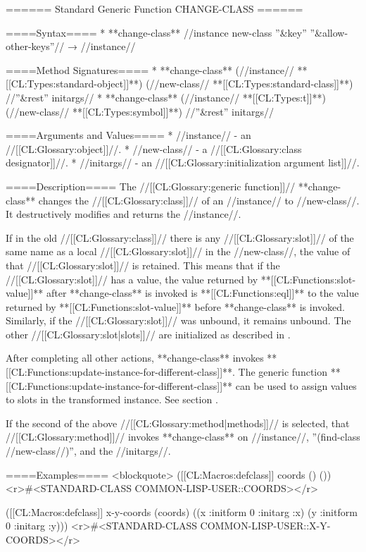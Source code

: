 ====== Standard Generic Function CHANGE-CLASS ======

====Syntax====
  * **change-class** //instance new-class ''&key'' ''&allow-other-keys''// → //instance//

====Method Signatures====
  * **change-class** (//instance// **[[CL:Types:standard-object]]**) (//new-class// **[[CL:Types:standard-class]]**) //''&rest'' initargs//
  * **change-class** (//instance// **[[CL:Types:t]]**) (//new-class// **[[CL:Types:symbol]]**) //''&rest'' initargs//
  
====Arguments and Values====
  * //instance// - an //[[CL:Glossary:object]]//.
  * //new-class// - a //[[CL:Glossary:class designator]]//.
  * //initargs// - an //[[CL:Glossary:initialization argument list]]//.

====Description====
The //[[CL:Glossary:generic function]]// **change-class** changes the //[[CL:Glossary:class]]// of an //instance// to //new-class//. It destructively modifies and returns the //instance//.

If in the old //[[CL:Glossary:class]]// there is any //[[CL:Glossary:slot]]// of the same name as a local //[[CL:Glossary:slot]]// in the //new-class//, the value of that //[[CL:Glossary:slot]]// is retained. This means that if the //[[CL:Glossary:slot]]// has a value, the value returned by **[[CL:Functions:slot-value]]** after **change-class** is invoked is **[[CL:Functions:eql]]** to the value returned by **[[CL:Functions:slot-value]]** before **change-class** is invoked. Similarly, if the //[[CL:Glossary:slot]]// was unbound, it remains unbound. The other //[[CL:Glossary:slot|slots]]// are initialized as described in \secref\ChangingInstanceClass.

After completing all other actions, **change-class** invokes **[[CL:Functions:update-instance-for-different-class]]**. The generic function **[[CL:Functions:update-instance-for-different-class]]** can be used to assign values to slots in the transformed instance. See section {\secref\InitNewLocalSlots}.

If the second of the above //[[CL:Glossary:method|methods]]// is selected, that //[[CL:Glossary:method]]// invokes **change-class** on //instance//, ''(find-class //new-class//)'', and the //initargs//.

====Examples====
<blockquote>
([[CL:Macros:defclass]] coords () ())
<r>#<STANDARD-CLASS COMMON-LISP-USER::COORDS></r>

([[CL:Macros:defclass]] x-y-coords (coords) 
  ((x :initform 0 :initarg :x) 
   (y :initform 0 :initarg :y)))
<r>#<STANDARD-CLASS COMMON-LISP-USER::X-Y-COORDS></r>

